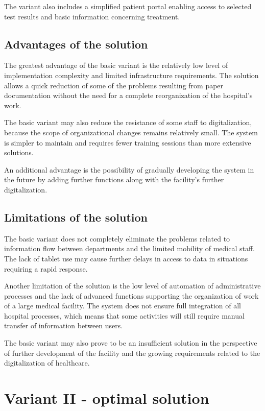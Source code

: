     The variant also includes a simplified patient portal enabling access to selected test results and basic information concerning treatment.

    \subsection{Advantages of the solution}
    The greatest advantage of the basic variant is the relatively low level of implementation complexity and limited infrastructure requirements. The solution allows a quick reduction of some of the problems resulting from paper documentation without the need for a complete reorganization of the hospital's work.

    The basic variant may also reduce the resistance of some staff to digitalization, because the scope of organizational changes remains relatively small. The system is simpler to maintain and requires fewer training sessions than more extensive solutions.

    An additional advantage is the possibility of gradually developing the system in the future by adding further functions along with the facility's further digitalization.

    \subsection{Limitations of the solution}
    The basic variant does not completely eliminate the problems related to information flow between departments and the limited mobility of medical staff. The lack of tablet use may cause further delays in access to data in situations requiring a rapid response.

    Another limitation of the solution is the low level of automation of administrative processes and the lack of advanced functions supporting the organization of work of a large medical facility. The system does not ensure full integration of all hospital processes, which means that some activities will still require manual transfer of information between users.

    The basic variant may also prove to be an insufficient solution in the perspective of further development of the facility and the growing requirements related to the digitalization of healthcare.

    \section{Variant II - optimal solution}

